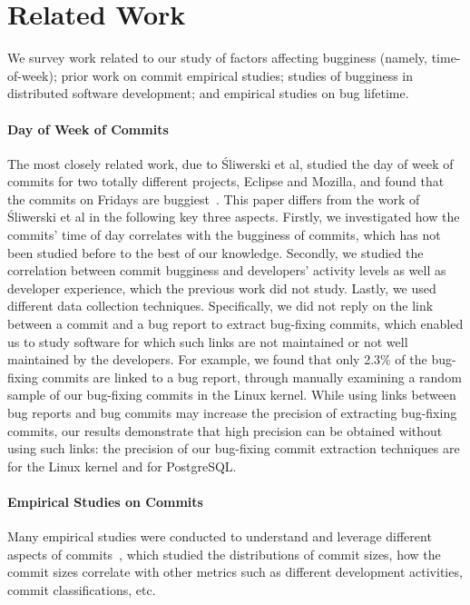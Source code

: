 \section{Related Work}
\label{sec-related}
We survey work related to our study of factors affecting bugginess
(namely, time-of-week); prior work on commit empirical studies; studies
of bugginess in distributed software development; and empirical studies 
on bug lifetime.

\paragraph{Day of Week of Commits}
The most closely related work, due to \'Sliwerski et al, studied the day of week of commits for two totally different projects, Eclipse and Mozilla, and
found that the commits on Fridays are buggiest~\cite{sliwerski-msr-2005}. 
This paper differs from the work of \'Sliwerski et al in the following key three aspects.
Firstly, we investigated how the commits' time of day correlates with the bugginess of commits, 
which has not been studied before to the best of our knowledge.
Secondly, we studied the correlation between commit bugginess and developers' activity levels as well as 
developer experience, which the previous work did not study.
Lastly, we used different data collection techniques. Specifically, we did not reply on the link 
between a commit and a bug report to extract bug-fixing commits, which enabled us to study 
software for which such links are not maintained or not well maintained by the developers. For example, we 
found that only 2.3\% of the bug-fixing commits are linked to a bug report, 
through manually examining a random sample of our bug-fixing commits in the Linux kernel.
While using links between bug reports and bug commits may increase the precision of extracting 
bug-fixing commits, our results demonstrate that 
high precision can be obtained without using such links: 
the precision of our bug-fixing commit extraction techniques are 
\linuxP for the Linux kernel and \postP for PostgreSQL.

\paragraph{Empirical Studies on Commits}
Many empirical studies were conducted to understand and leverage different aspects of 
commits~\cite{hattori2008nature,largeCommits,commitTextualClassification, smallCommits05, Swanson76}, which 
studied the distributions of commit sizes, how the commit sizes correlate with other metrics 
such as different development activities, commit classifications, etc. 

